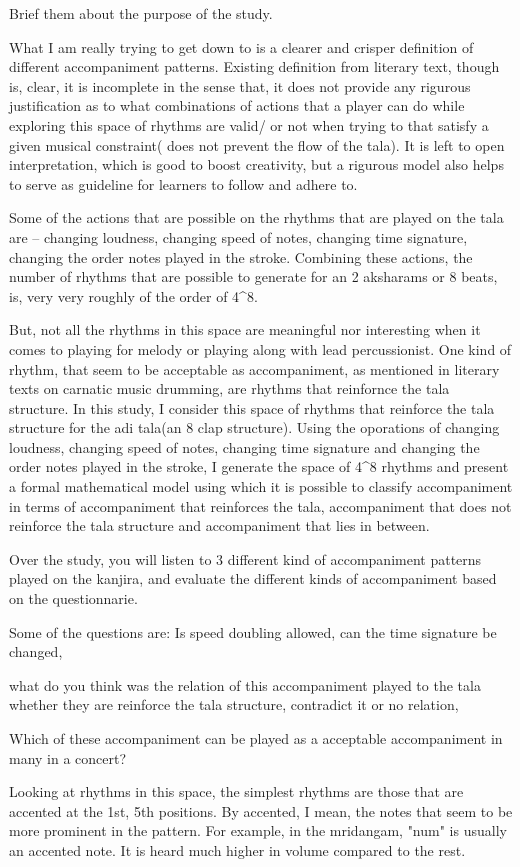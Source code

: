 
\item Brief them about the purpose of the study.

What I am really trying to get down to is a clearer and crisper definition of different accompaniment patterns. Existing definition from  literary text, though is, clear, it is incomplete in the sense that, it does not provide any rigurous justification as to what combinations of actions that a player can do while exploring this space of rhythms are valid/ or not when trying to that satisfy a given musical constraint( does not prevent the flow of the tala). It is left to open interpretation, which is good to boost creativity, but a rigurous model also helps to serve as guideline for learners to follow and adhere to.

Some of the actions that are possible on the rhythms that are played on the tala are -- changing loudness, changing speed of notes, changing time signature, changing the order notes played in the stroke. Combining these actions, the number of rhythms that are possible to generate for an 2 aksharams or 8 beats, is, very very roughly of the order of 4^8.

But, not all the rhythms in this space are meaningful nor interesting when it comes to playing for melody or playing along with lead percussionist. One kind of rhythm, that seem to be acceptable as accompaniment, as mentioned in literary texts on carnatic music drumming, are rhythms that reinfornce the tala structure. In this study, I consider this space of rhythms that reinforce the tala structure for the adi tala(an 8 clap structure). Using the oporations of changing loudness, changing speed of notes, changing time signature and changing the order notes played in the stroke, I generate the space of 4^8 rhythms and present a formal mathematical model using which it is possible to classify accompaniment in terms of accompaniment that reinforces the tala, accompaniment that does not reinforce the tala structure and accompaniment that lies in between.

Over the study, you will listen to 3 different kind of accompaniment patterns played on the kanjira, and evaluate the different kinds of accompaniment based on the questionnarie.



Some of the questions are: Is speed doubling allowed, can the time signature be changed, 

what do you think was the relation of this accompaniment played to the tala 
whether they are reinforce the tala structure, contradict it or no relation,

Which of these accompaniment can be played as a acceptable accompaniment in many in a concert?


Looking at rhythms in this space, the simplest rhythms are those that are accented at the 1st, 5th positions. By accented, I mean, the notes that seem to be more prominent in the pattern. For example, in the mridangam, "num" is usually an accented note. It is heard much higher in volume compared to the rest. 


